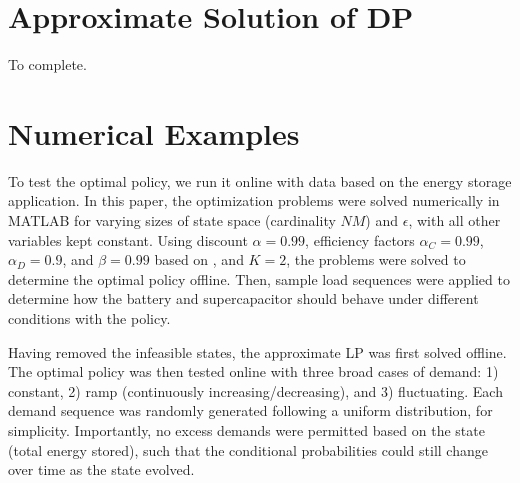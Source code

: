 \documentclass[conference]{IEEEtran}
\begin{document}
\section{Approximate Solution of DP}

To complete.

\section{Numerical Examples}
To test the optimal policy, we run it online with data based on the energy storage application. In this paper, the optimization problems were solved numerically in MATLAB for varying sizes of state space (cardinality $NM$) and $\epsilon$, with all other variables kept constant. Using discount $\alpha=0.99$, efficiency factors $\alpha_{C}=0.99$, $\alpha_{D}=0.9$, and $\beta=0.99$ based on \cite{su2013modeling}, and $K=2$, the problems were solved to determine the optimal policy offline. Then, sample load sequences were applied to determine how the battery and supercapacitor should behave under different conditions with the policy.

Having removed the infeasible states, the approximate LP was first solved offline. The optimal policy was then tested online with three broad cases of demand: 1) constant, 2) ramp (continuously increasing/decreasing), and 3) fluctuating. Each demand sequence was randomly generated following a uniform distribution, for simplicity. Importantly, no excess demands were permitted based on the state (total energy stored), such that the conditional probabilities could still change over time as the state evolved.
\end{document}
